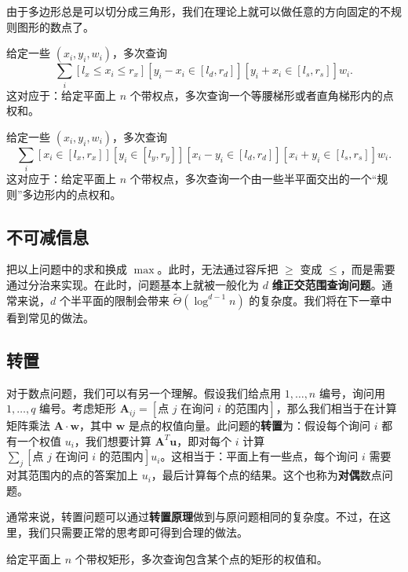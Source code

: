 由于多边形总是可以切分成三角形，我们在理论上就可以做任意的方向固定的不规则图形的数点了。

\begin{example}[梯形数点]
    给定一些 $(x_i,y_i,w_i)$，多次查询
    $$
    \sum_i [l_x\le x_i\le r_x][y_i-x_i\in [l_{d},r_{d}]][y_i+x_i\in [l_{s},r_{s}]]w_i.
    $$
    这对应于：给定平面上 $n$ 个带权点，多次查询一个等腰梯形或者直角梯形内的点权和。
\end{example}

\begin{exercise}[*半平面交数点]
    给定一些 $(x_i,y_i,w_i)$，多次查询
    $$
    \sum_i [x_i\in [l_x,r_x]][y_i\in [l_y,r_y]][x_i-y_i\in [l_{d},r_{d}]][x_i+y_i\in [l_{s},r_{s}]]w_i.
    $$
    这对应于：给定平面上 $n$ 个带权点，多次查询一个由一些半平面交出的一个“规则”多边形内的点权和。
\end{exercise}

\subsection{不可减信息}

把以上问题中的求和换成 $\max$。此时，无法通过容斥把 $\ge$ 变成 $\le$，而是需要通过分治来实现。在此时，问题基本上就被一般化为 $d$ \textbf{维正交范围查询问题}。通常来说，$d$ 个半平面的限制会带来 $\tilde\Theta(\log^{d-1}n)$ 的复杂度。我们将在下一章中看到常见的做法。

\subsection{转置}

对于数点问题，我们可以有另一个理解。假设我们给点用 $1,\ldots,n$ 编号，询问用 $1,\ldots,q$ 编号。考虑矩形 $\mathbf A_{ij}=[\text{点 }j\text{ 在询问 }i\text{ 的范围内}]$，那么我们相当于在计算矩阵乘法 $\mathbf A \cdot \mathbf w$，其中 $\mathbf w$ 是点的权值向量。此问题的\textbf{转置}为：假设每个询问 $i$ 都有一个权值 $u_i$，我们想要计算 $\mathbf A^T\mathbf u$，即对每个 $i$ 计算 $\sum_j [\text{点 }j\text{ 在询问 }i\text{ 的范围内}]u_i$。这相当于：平面上有一些点，每个询问 $i$ 需要对其范围内的点的答案加上 $u_i$，最后计算每个点的结果。这个也称为\textbf{对偶}数点问题。

通常来说，转置问题可以通过\textbf{转置原理}做到与原问题相同的复杂度。不过，在这里，我们只需要正常的思考即可得到合理的做法。
\begin{example}[对偶二维数点]
    给定平面上 $n$ 个带权矩形，多次查询包含某个点的矩形的权值和。
\end{example}

